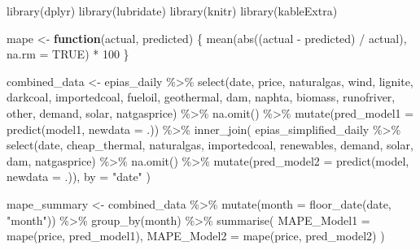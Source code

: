 \documentclass[
  11pt,
  a4paper,
]{article}
\newenvironment{Shaded}{\begin{snugshade}}{\end{snugshade}}
\newcommand{\AttributeTok}[1]{\textcolor[rgb]{0.40,0.45,0.13}{#1}}
\newcommand{\ConstantTok}[1]{\textcolor[rgb]{0.56,0.35,0.01}{#1}}
\newcommand{\ControlFlowTok}[1]{\textcolor[rgb]{0.00,0.23,0.31}{\textbf{#1}}}
\newcommand{\DecValTok}[1]{\textcolor[rgb]{0.68,0.00,0.00}{#1}}
\newcommand{\FunctionTok}[1]{\textcolor[rgb]{0.28,0.35,0.67}{#1}}
\newcommand{\NormalTok}[1]{\textcolor[rgb]{0.00,0.23,0.31}{#1}}
\newcommand{\OtherTok}[1]{\textcolor[rgb]{0.00,0.23,0.31}{#1}}
\newcommand{\SpecialCharTok}[1]{\textcolor[rgb]{0.37,0.37,0.37}{#1}}
\newcommand{\StringTok}[1]{\textcolor[rgb]{0.13,0.47,0.30}{#1}}
\begin{document}
\begin{Shaded}
\begin{Highlighting}[]
\FunctionTok{library}\NormalTok{(dplyr)}
\FunctionTok{library}\NormalTok{(lubridate)}
\FunctionTok{library}\NormalTok{(knitr)}
\FunctionTok{library}\NormalTok{(kableExtra)}

\NormalTok{mape }\OtherTok{\textless{}{-}} \ControlFlowTok{function}\NormalTok{(actual, predicted) \{}
  \FunctionTok{mean}\NormalTok{(}\FunctionTok{abs}\NormalTok{((actual }\SpecialCharTok{{-}}\NormalTok{ predicted) }\SpecialCharTok{/}\NormalTok{ actual), }\AttributeTok{na.rm =} \ConstantTok{TRUE}\NormalTok{) }\SpecialCharTok{*} \DecValTok{100}
\NormalTok{\}}

\NormalTok{combined\_data }\OtherTok{\textless{}{-}}\NormalTok{ epias\_daily }\SpecialCharTok{\%\textgreater{}\%}
  \FunctionTok{select}\NormalTok{(date, price,}
\NormalTok{         naturalgas, wind, lignite, darkcoal, importedcoal, fueloil,}
\NormalTok{         geothermal, dam, naphta, biomass, runofriver, other, demand, solar, natgasprice) }\SpecialCharTok{\%\textgreater{}\%}
  \FunctionTok{na.omit}\NormalTok{() }\SpecialCharTok{\%\textgreater{}\%}
  \FunctionTok{mutate}\NormalTok{(}\AttributeTok{pred\_model1 =} \FunctionTok{predict}\NormalTok{(model1, }\AttributeTok{newdata =}\NormalTok{ .)) }\SpecialCharTok{\%\textgreater{}\%}
  \FunctionTok{inner\_join}\NormalTok{(}
\NormalTok{    epias\_simplified\_daily }\SpecialCharTok{\%\textgreater{}\%}
      \FunctionTok{select}\NormalTok{(date,}
\NormalTok{             cheap\_thermal, naturalgas, importedcoal, renewables, demand, solar, dam, natgasprice) }\SpecialCharTok{\%\textgreater{}\%}
      \FunctionTok{na.omit}\NormalTok{() }\SpecialCharTok{\%\textgreater{}\%}
      \FunctionTok{mutate}\NormalTok{(}\AttributeTok{pred\_model2 =} \FunctionTok{predict}\NormalTok{(model, }\AttributeTok{newdata =}\NormalTok{ .)),}
    \AttributeTok{by =} \StringTok{"date"}
\NormalTok{  )}

\NormalTok{mape\_summary }\OtherTok{\textless{}{-}}\NormalTok{ combined\_data }\SpecialCharTok{\%\textgreater{}\%}
  \FunctionTok{mutate}\NormalTok{(}\AttributeTok{month =} \FunctionTok{floor\_date}\NormalTok{(date, }\StringTok{"month"}\NormalTok{)) }\SpecialCharTok{\%\textgreater{}\%}
  \FunctionTok{group\_by}\NormalTok{(month) }\SpecialCharTok{\%\textgreater{}\%}
  \FunctionTok{summarise}\NormalTok{(}
    \AttributeTok{MAPE\_Model1 =} \FunctionTok{mape}\NormalTok{(price, pred\_model1),}
    \AttributeTok{MAPE\_Model2 =} \FunctionTok{mape}\NormalTok{(price, pred\_model2)}
\NormalTok{  )}


\end{Highlighting}
\end{Shaded}
\end{document}
